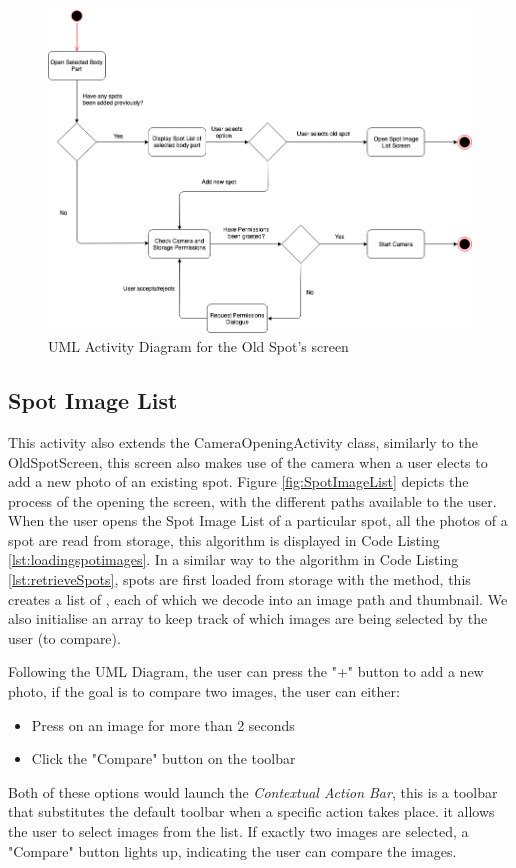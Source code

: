 \begin{figure}
    \includegraphics[width=1.2\textwidth, center]{figures/OldSpotList.png}
    \caption{UML Activity Diagram for the Old Spot's screen}
    \label{fig:OldSpotList}
\end{figure}

\subsection{Spot Image List}

This activity also extends the CameraOpeningActivity class, similarly to the OldSpotScreen, this screen also makes use of the camera when a user elects to add a new photo of an existing spot. Figure \ref{fig:SpotImageList} depicts the process of the opening the screen, with the different paths available to the user. When the user opens the Spot Image List of a particular spot, all the photos of a spot are read from storage, this algorithm is displayed in Code Listing \ref{lst:loadingspotimages}. In a similar way to the algorithm in Code Listing \ref{lst:retrieveSpots}, spots are first loaded from storage with the  method, this creates a list of , each of which we decode into an image path and thumbnail. We also initialise an array  to keep track of which images are being selected by the user (to compare).

Following the UML Diagram, the user can press the "+" button to add a new photo, if the goal is to compare two images, the user can either:
\begin{itemize}
    \item Press on an image for more than 2 seconds
    \item Click the "Compare" button on the toolbar
\end{itemize}
Both of these options would launch the \emph{Contextual Action Bar}, this is a toolbar that substitutes the default toolbar when a specific action takes place. it allows the user to select images from the list. If exactly two images are selected, a "Compare" button lights up, indicating the user can compare the images.

